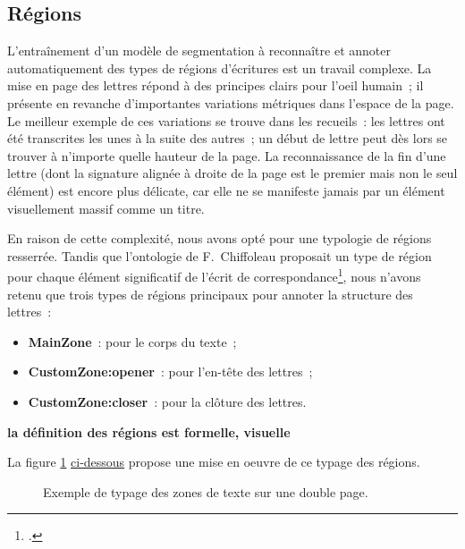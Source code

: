 \documentclass[a4paper,12pt,twoside]{book}
\begin{document}
			\subsection{Régions}
				L'entraînement d'un modèle de segmentation à reconnaître et annoter automatiquement des types de régions d'écritures est un travail complexe. La mise en page des lettres répond à des principes clairs pour l'oeil humain~; il présente en revanche d'importantes variations métriques dans l'espace de la page. Le meilleur exemple de ces variations se trouve dans les recueils~: les lettres ont été transcrites les unes à la suite des autres~; un début de lettre peut dès lors se trouver à n'importe quelle hauteur de la page. La reconnaissance de la fin d'une lettre (dont la signature alignée à droite de la page est le premier mais non le seul élément) est encore plus délicate, car elle ne se manifeste jamais par un élément visuellement massif comme un titre.
				
				En raison de cette complexité, nous avons opté pour une typologie de régions resserrée. Tandis que l'ontologie de F.~Chiffoleau proposait un type de région pour chaque élément significatif de l'écrit de correspondance\footcite{chiffoleauCorrespondanceLangueFrancaise2021}, nous n'avons retenu que trois types de régions principaux pour annoter la structure des lettres~:
				
				\begin{itemize}
					\item \textbf{MainZone}~: pour le corps du texte~;
					\item \textbf{CustomZone:opener}~: pour l'en-tête des lettres~;
					\item \textbf{CustomZone:closer}~: pour la clôture des lettres.
				\end{itemize}
			
				\textbf{la définition des régions est formelle, visuelle}
			
			La figure \ref{typageRegions} \hyperref[typageRegions]{ci-dessous} propose une mise en oeuvre de ce typage des régions.	
			
			\begin{figure}[!h]
				\centering
				\caption{Exemple de typage des zones de texte sur une double page.}%
				\label{typageRegions}%
			\end{figure}
			
\end{document}
